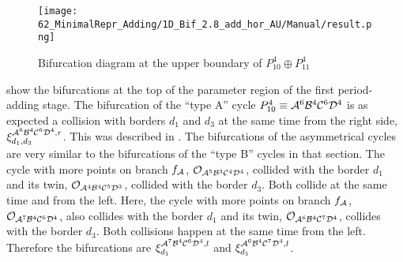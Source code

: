 \begin{figure}
    \centering
    \texttt{[image: 62\_MinimalRepr\_Adding/1D\_Bif\_2.8\_add\_hor\_AU/Manual/result.png]}
    \caption{Bifurcation diagram at the upper boundary of $P_{10}^4 \oplus P_{11}^4$}
    \label{fig:minrep.add.app.hor.bif.AU}
\end{figure}


 show the bifurcations at the top of the parameter region of the first period-adding stage.
The bifurcation of the ``type A'' cycle $P_{10}^4 \equiv \mathcal{A}^6\mathcal{B}^4\mathcal{C}^6\mathcal{D}^4$ is as expected a collision with borders $d_1$ and $d_3$ at the same time from the right side, $\xi_{d_1, d_3}^{\mathcal{A}^6\mathcal{B}^4\mathcal{C}^6\mathcal{D}^4, r}$.
This was described in .
The bifurcations of the asymmetrical cycles are very similar to the bifurcations of the ``type B'' cycles in that section.
The cycle with more points on branch $f_{\mathcal{A}}$, $\mathcal{O}_{\mathcal{A}^5\mathcal{B}^3\mathcal{C}^4\mathcal{D}^4}$, collided with the border $d_1$ and its twin, $\mathcal{O}_{\mathcal{A}^4\mathcal{B}^4\mathcal{C}^5\mathcal{D}^3}$, collided with the border $d_3$.
Both collide at the same time and from the left.
Here, the cycle with more points on branch $f_{\mathcal{A}}$, $\mathcal{O}_{\mathcal{A}^7\mathcal{B}^4\mathcal{C}^6\mathcal{D}^4}$, also collides with the border $d_1$ and its twin, $\mathcal{O}_{\mathcal{A}^6\mathcal{B}^4\mathcal{C}^7\mathcal{D}^4}$, collides with the border $d_3$.
Both collisions happen at the same time from the left.
Therefore the bifurcations are $\xi_{d_1}^{\mathcal{A}^7\mathcal{B}^4\mathcal{C}^6\mathcal{D}^4, l}$ and $\xi_{d_1}^{\mathcal{A}^6\mathcal{B}^4\mathcal{C}^7\mathcal{D}^4, l}$.
